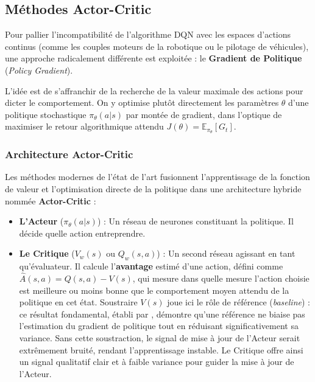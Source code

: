 \subsection{Méthodes Actor-Critic}

Pour pallier l'incompatibilité de l'algorithme DQN avec les espaces d'actions continus (comme les couples moteurs de la robotique ou le pilotage de véhicules), une approche radicalement différente est exploitée : le \textbf{Gradient de Politique} (\textit{Policy Gradient}).

L'idée est de s'affranchir de la recherche de la valeur maximale des actions pour dicter le comportement. On y optimise plutôt directement les paramètres $\theta$ d'une politique stochastique $\pi_\theta(a|s)$ par montée de gradient, dans l'optique de maximiser le retour algorithmique attendu $J(\theta) = \mathbb{E}_{\pi_\theta}[G_t]$.

\subsubsection{Architecture Actor-Critic}

Les méthodes modernes de l'état de l'art fusionnent l'apprentissage de la fonction de valeur et l'optimisation directe de la politique dans une architecture hybride nommée \textbf{Actor-Critic} \parencite{suttonReinforcementLearningIntroduction2018} :
\begin{itemize}
    \item \textbf{L'Acteur} ($\pi_\theta(a|s)$) : Un réseau de neurones constituant la politique. Il décide quelle action entreprendre.
    \item \textbf{Le Critique} ($V_w(s)$ ou $Q_w(s,a)$) : Un second réseau agissant en tant qu'évaluateur. Il calcule l'\textbf{avantage} estimé d'une action, défini comme $\hat{A}(s,a) = Q(s,a) - V(s)$, qui mesure dans quelle mesure l'action choisie est meilleure ou moins bonne que le comportement moyen attendu de la politique en cet état. Soustraire $V(s)$ joue ici le rôle de référence (\textit{baseline}) : ce résultat fondamental, établi par \textcite{williamsSimpleStatisticalGradientfollowing1992}, démontre qu'une référence ne biaise pas l'estimation du gradient de politique tout en réduisant significativement sa variance. Sans cette soustraction, le signal de mise à jour de l'Acteur serait extrêmement bruité, rendant l'apprentissage instable. Le Critique offre ainsi un signal qualitatif clair et à faible variance pour guider la mise à jour de l'Acteur.
\end{itemize}

